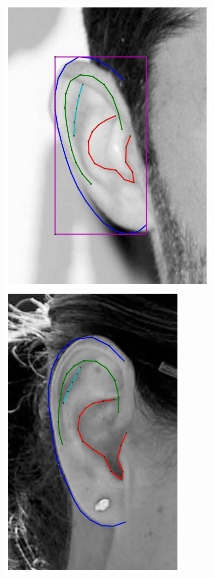 \begin{figure}
    \hfill
    \includegraphics[height=\flowhh]{resources/Ear_Deformable_Model/fittings/initial_0024}
    \hfill
    \includegraphics[height=\flowhh]{resources/Ear_Deformable_Model/fittings/final_0012}

\end{figure}

